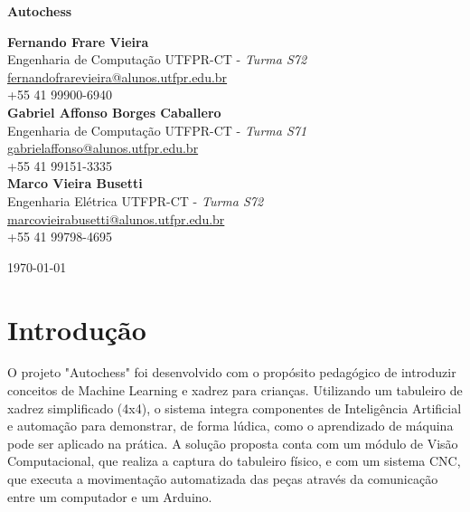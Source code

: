 \documentclass[a4paper,12pt]{article}
\date{\today}
\begin{document}
  

\vspace{1em}  
\begin{center}  
    \Large\textbf{Autochess}  
\end{center}  

\vspace{1em}  

\begin{center}  
    \textbf{Fernando Frare Vieira} \\
	Engenharia de Computação UTFPR-CT - \textit{Turma S72}\\
    \href{mailto:fernandofrarevieira@alunos.utfpr.edu.br}{fernandofrarevieira@alunos.utfpr.edu.br} \\  
    +55 41 99900-6940 \\[1.5em]  
    \textbf{Gabriel Affonso Borges Caballero} \\ 
	Engenharia de Computação UTFPR-CT - \textit{Turma S71}\\
    \href{mailto:gabrielaffonso@alunos.utfpr.edu.br}{gabrielaffonso@alunos.utfpr.edu.br} \\  
    +55 41 99151-3335\\[1.5em]  
    \textbf{Marco Vieira Busetti} \\ 
	Engenharia Elétrica UTFPR-CT - \textit{Turma S72}\\
    \href{mailto:marcovieirabusetti@alunos.utfpr.edu.br}{marcovieirabusetti@alunos.utfpr.edu.br} \\  
    +55 41 99798-4695  
\end{center}  

\vspace{1em}  
\begin{center}  
    \today  
\end{center}  
\vspace{2em}  

\section{Introdução}  
O projeto "Autochess" \; foi desenvolvido com o propósito pedagógico de introduzir conceitos de Machine Learning e xadrez para crianças. Utilizando um tabuleiro de xadrez simplificado (4x4), o sistema integra componentes de Inteligência Artificial e automação para demonstrar, de forma lúdica, como o aprendizado de máquina pode ser aplicado na prática. A solução proposta conta com um módulo de Visão Computacional, que realiza a captura do tabuleiro físico, e com um sistema CNC, que executa a movimentação automatizada das peças através da comunicação entre um computador e um Arduino.  
\end{document}
